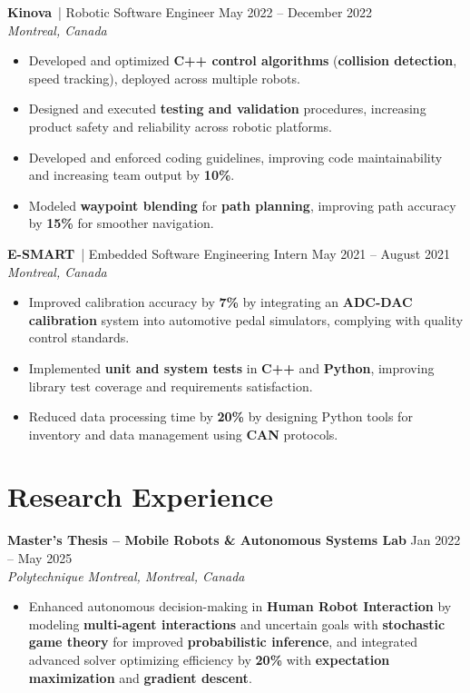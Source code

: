 \documentclass[9.5pt,letterpaper]{article}
\begin{document}
\textbf{Kinova} \,{| Robotic Software Engineer} \hfill {\small May 2022 -- December 2022} \\
{\small\textit{Montreal, Canada}}
\begin{itemize}
    \item Developed and optimized \textbf{C++ control algorithms} (\textbf{collision detection}, speed tracking), deployed across multiple robots.
    \item Designed and executed \textbf{testing and validation} procedures, increasing product safety and reliability across robotic platforms.
    \item Developed and enforced coding guidelines, improving code maintainability and increasing team output by \textbf{10\%}.
    \item Modeled \textbf{waypoint blending} for \textbf{path planning}, improving path accuracy by \textbf{15\%} for smoother navigation.
\end{itemize}

\vspace{1pt}

\textbf{E-SMART} \,{| Embedded Software Engineering Intern} \hfill {\small May 2021 -- August 2021} \\
{\small\textit{Montreal, Canada}}
\begin{itemize}
    \item Improved calibration accuracy by \textbf{7\%} by integrating an \textbf{ADC-DAC calibration} system into automotive pedal simulators, complying with quality control standards.
    \item Implemented \textbf{unit and system tests} in \textbf{C++} and \textbf{Python}, improving library test coverage and requirements satisfaction.
    \item Reduced data processing time by \textbf{20\%} by designing Python tools for inventory and data management using \textbf{CAN} protocols.
\end{itemize}

\section*{Research Experience}
\textbf{Master's Thesis -- Mobile Robots \& Autonomous Systems Lab} \hfill {\small Jan 2022 -- May 2025} \\
{\small\textit{Polytechnique Montreal, Montreal, Canada}}
\begin{itemize}
    \item Enhanced autonomous decision-making in \textbf{Human Robot Interaction} by modeling \textbf{multi-agent interactions} and uncertain goals with \textbf{stochastic game theory} for improved \textbf{probabilistic inference}, and integrated advanced solver optimizing efficiency by \textbf{20\%} with \textbf{expectation maximization} and \textbf{gradient descent}.
\end{itemize}
\end{document}
